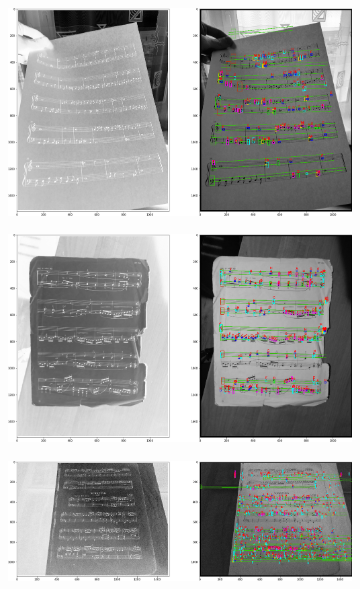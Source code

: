 \documentclass[12pt]{article}
\begin{document}
\begin{enumerate}
			\begin{figure}
				\begin{subfigure}[b]{0.48\linewidth}
					\includegraphics[width=\linewidth]{Hard/Zdj30.png}
				\end{subfigure}
				\begin{subfigure}[b]{0.48\linewidth}
					\includegraphics[width=\linewidth]{Hard/Zdj31.png}
				\end{subfigure}
				\begin{subfigure}[b]{0.48\linewidth}
					\includegraphics[width=\linewidth]{Hard/Zdj32.png}
				\end{subfigure}

\end{figure}
\end{enumerate}
\end{document}
